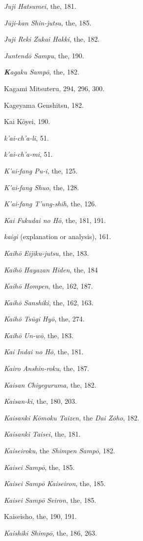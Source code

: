 \documentclass[11pt]{article}
\begin{document}
\emph{Juji Hatsumei}, the, 181.\par
\emph{Jūji-kan Shin-jutsu}, the, 185.\par
\emph{Juji Reki Zukai Hakki}, the, 182.\par
\emph{Juntendō Sampu}, the, 190.\par
\medskip
\emph{\textbf{K}agaku Sampō}, the, 182.\par
Kagami Mitsuteru, 294, 296, 300.\par
Kageyama Genshitsu, 182.\par
Kai Kōyei, 190.\par
\emph{k'ai-ch'a-li}, 51.\par
\emph{k'ai-ch'a-mi}, 51.\par
\emph{K'ai-fang Pu-i}, the, 125.\par
\emph{K'ai-fang Shuo}, the, 128.\par
\emph{K'ai-fang T'ung-shih}, the, 126.\par
\emph{Kai Fukudai no Hō}, the, 181, 191.\par
\emph{kaigi} (explanation or analysis), 161.\par
\emph{Kaihō Eijiku-jutsu}, the, 183.\par
\emph{Kaihō Hayazan Hiden}, the, 184\par
\emph{Kaihō Hompen}, the, 162, 187.\par
\emph{Kaihō Sanshiki}, the, 162, 163.\par
\emph{Kaihō Tsūgi Hyō}, the, 274.\par
\emph{Kaihō Un-wō}, the, 183.\par
\emph{Kai Indai no Hō}, the, 181.\par
\emph{Kairo Anshin-roku}, the, 187.\par
\emph{Kaisan Chiyeguruma}, the, 182.\par
\emph{Kaisan-ki}, the, 180, 203.\par
\emph{Kaisanki Kōmoku Taizen}, the \emph{Dai Zōho}, 182.\par
\emph{Kaisanki Taisei}, the, 181.\par
\emph{Kaiseiroku}, the \emph{Shimpen Sampō}, 182.\par
\emph{Kaisei Sampō}, the, 185.\par
\emph{Kaisei Sampō Kaiseiron}, the, 185.\par
\emph{Kaisei Sampō Seiron}, the, 185.\par
Kaiseisho, the, 190, 191.\par
\emph{Kaishiki Shimpō}, the, 186, 263.\par
\end{document}
